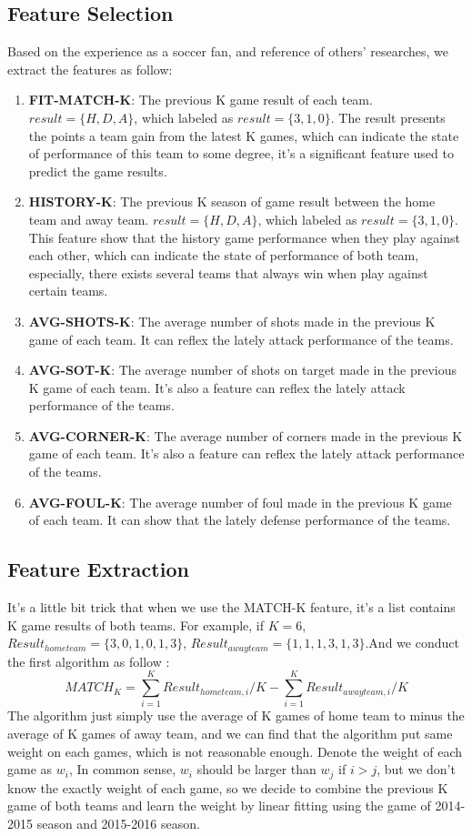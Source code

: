 \documentclass[conference,11pt]{article}
\begin{document}
\subsection{Feature Selection}
Based on the experience as a soccer fan, and reference of others' researches, we extract the features as follow:
\begin{enumerate}
\item \textbf{FIT-MATCH-K}:
The previous K game result of each team. $result = \{H,D,A\}$, which labeled as $result = \{3,1,0\}$. The result presents the points a team gain from the latest K games, which can indicate the state of performance of this team to some degree, it's a significant feature used to predict the game results.
\item \textbf{HISTORY-K}:
The previous K season of game result between the home team and away team. $result = \{H,D,A\}$, which labeled as $result = \{3,1,0\}$. This feature show that the history game performance when they play against each other, which can indicate the state of performance of both team, especially, there exists several teams that always win when play against certain teams.
\item \textbf{AVG-SHOTS-K}:
The average number of shots made in the  previous K game of each team. It can reflex the lately attack performance of the teams.
\item \textbf{AVG-SOT-K}:
The average number of shots on target made in the previous K game of each team. It's also a feature can reflex the lately attack performance of the teams.
\item \textbf{AVG-CORNER-K}:
The average number of corners made in the previous K game of each team. It's also a feature can reflex the lately attack performance of the teams.
\item \textbf{AVG-FOUL-K}:
The average number of foul made in the previous K game of each team. It can show that the lately defense performance of the teams.
\end{enumerate}

\subsection{Feature Extraction}
It's a little bit trick that when we use the MATCH-K feature, it's a list contains K game results of both teams. For example, if $K = 6$, $Result_{home team} = \{3,0,1,0,1,3\}$, $Result_{away team} = \{1,1,1,3,1,3\}$.And we conduct the first algorithm as follow :\\
\begin{equation}
MATCH_K = \sum_{i=1}^{K}Result_{home team, i}/K - \sum_{i=1}^{K}Result_{away team, i}/K
\end{equation}
The algorithm just simply use the average of K games of home team to minus the average of K games of away team, and we can find that the algorithm put same weight on each games, which is not reasonable enough. Denote the weight of each game as $w_i$, In common sense, $w_i$ should be larger than $w_j$ if $i > j$, but we don't know the exactly weight of each game, so we decide to combine the previous K game of both teams and  learn the weight by linear fitting using the game of 2014-2015 season and 2015-2016 season.
\end{document}

